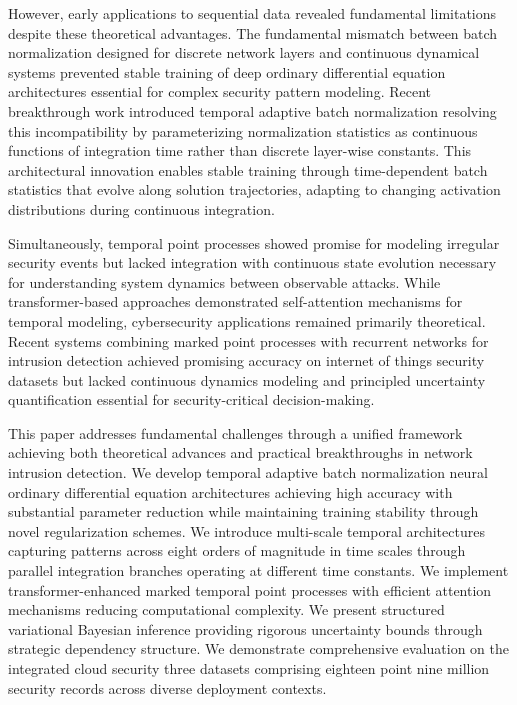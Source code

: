 \documentclass[10pt,journal,compsoc]{IEEEtran}
\begin{document}
However, early applications to sequential data revealed fundamental limitations despite these theoretical advantages. The fundamental mismatch between batch normalization designed for discrete network layers and continuous dynamical systems prevented stable training of deep ordinary differential equation architectures essential for complex security pattern modeling. Recent breakthrough work introduced temporal adaptive batch normalization resolving this incompatibility by parameterizing normalization statistics as continuous functions of integration time rather than discrete layer-wise constants. This architectural innovation enables stable training through time-dependent batch statistics that evolve along solution trajectories, adapting to changing activation distributions during continuous integration.

Simultaneously, temporal point processes showed promise for modeling irregular security events but lacked integration with continuous state evolution necessary for understanding system dynamics between observable attacks. While transformer-based approaches demonstrated self-attention mechanisms for temporal modeling, cybersecurity applications remained primarily theoretical. Recent systems combining marked point processes with recurrent networks for intrusion detection achieved promising accuracy on internet of things security datasets but lacked continuous dynamics modeling and principled uncertainty quantification essential for security-critical decision-making.

This paper addresses fundamental challenges through a unified framework achieving both theoretical advances and practical breakthroughs in network intrusion detection. We develop temporal adaptive batch normalization neural ordinary differential equation architectures achieving high accuracy with substantial parameter reduction while maintaining training stability through novel regularization schemes. We introduce multi-scale temporal architectures capturing patterns across eight orders of magnitude in time scales through parallel integration branches operating at different time constants. We implement transformer-enhanced marked temporal point processes with efficient attention mechanisms reducing computational complexity. We present structured variational Bayesian inference providing rigorous uncertainty bounds through strategic dependency structure. We demonstrate comprehensive evaluation on the integrated cloud security three datasets comprising eighteen point nine million security records across diverse deployment contexts.
\end{document}
